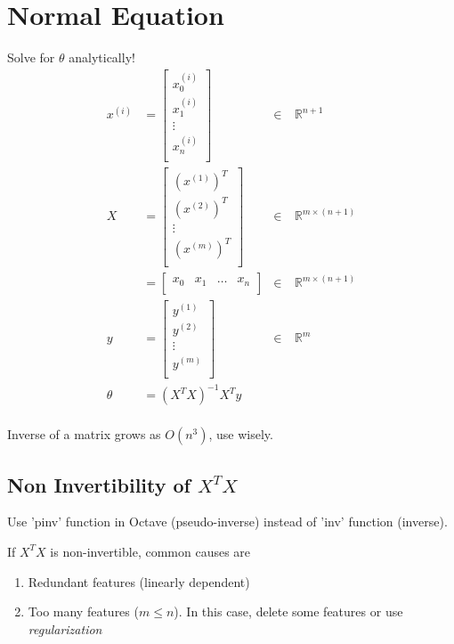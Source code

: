 \documentclass[a4paper, 12pt]{report}
\def\R{\mathbb{R}}
\begin{document}
\section{Normal Equation}
Solve for $\theta$ analytically!
\begin{align*}
	x^{(i)} & = \begin{bmatrix}
		x_0^{(i)} \\
		x_1^{(i)} \\
		\vdots    \\
		x_n^{(i)} \\
	\end{bmatrix} & \in & \ \R^{n+1}            \\
	X       & = \begin{bmatrix}
		(x^{(1)})^T \\
		(x^{(2)})^T \\
		\vdots      \\
		(x^{(m)})^T \\
	\end{bmatrix} & \in & \ \R^{m \times (n+1)} \\
	        & = \begin{bmatrix}
		x_0 & x_1 & \dots & x_n \\
	\end{bmatrix} & \in & \ \R^{m \times (n+1)} \\
	y       & = \begin{bmatrix}
		y^{(1)} \\
		y^{(2)} \\
		\vdots  \\
		y^{(m)} \\
	\end{bmatrix} & \in & \ \R^m                \\
	\theta  & = (X^TX)^{-1}X^Ty                                          \\
\end{align*}

Inverse of a matrix grows as $O(n^3)$, use wisely.

\subsection{Non Invertibility of \texorpdfstring{$X^TX$}{}}
Use 'pinv' function in Octave (pseudo-inverse) instead of 'inv' function (inverse).

If $X^TX$ is non-invertible, common causes are
\begin{enumerate}
	\item Redundant features (linearly dependent)
	\item Too many features ($m \le n$). In this case, delete some features or use \emph{regularization}
\end{enumerate}
\end{document}
